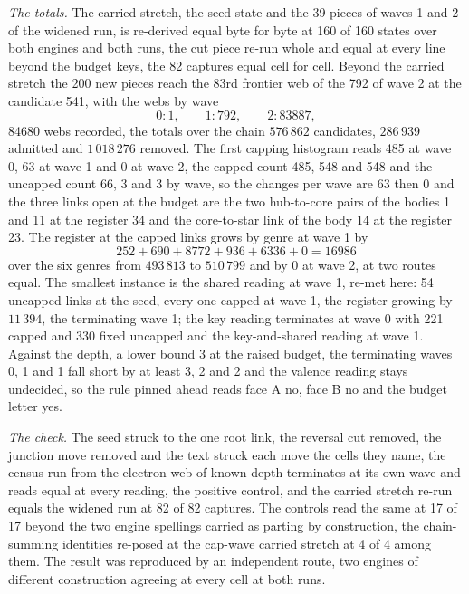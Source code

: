 \begin{chproof}
\textit{The totals.} The carried stretch, the seed state and the 39 pieces of waves 1 and 2 of the widened run, is re-derived equal byte for byte at 160 of 160 states over both engines and both runs, the cut piece re-run whole and equal at every line beyond the budget keys, the 82 captures equal cell for cell. Beyond the carried stretch the 200 new pieces reach the 83rd frontier web of the 792 of wave 2 at the candidate 541, with the webs by wave
\begin{equation}
0:1,\qquad 1:792,\qquad 2:83887,
\end{equation}
84680 webs recorded, the totals over the chain $576\,862$ candidates, $286\,939$ admitted and $1\,018\,276$ removed. The first capping histogram reads 485 at wave 0, 63 at wave 1 and 0 at wave 2, the capped count 485, 548 and 548 and the uncapped count 66, 3 and 3 by wave, so the changes per wave are 63 then 0 and the three links open at the budget are the two hub-to-core pairs of the bodies 1 and 11 at the register 34 and the core-to-star link of the body 14 at the register 23. The register at the capped links grows by genre at wave 1 by
\begin{equation}
252 + 690 + 8772 + 936 + 6336 + 0 = 16986
\end{equation}
over the six genres from $493\,813$ to $510\,799$ and by 0 at wave 2, at two routes equal. The smallest instance is the shared reading at wave 1, re-met here: 54 uncapped links at the seed, every one capped at wave 1, the register growing by $11\,394$, the terminating wave 1; the key reading terminates at wave 0 with 221 capped and 330 fixed uncapped and the key-and-shared reading at wave 1. Against the depth, a lower bound 3 at the raised budget, the terminating waves 0, 1 and 1 fall short by at least 3, 2 and 2 and the valence reading stays undecided, so the rule pinned ahead reads face A no, face B no and the budget letter yes.

\textit{The check.} The seed struck to the one root link, the reversal cut removed, the junction move removed and the text struck each move the cells they name, the census run from the electron web of known depth terminates at its own wave and reads equal at every reading, the positive control, and the carried stretch re-run equals the widened run at 82 of 82 captures. The controls read the same at 17 of 17 beyond the two engine spellings carried as parting by construction, the chain-summing identities re-posed at the cap-wave carried stretch at 4 of 4 among them. The result was reproduced by an independent route, two engines of different construction agreeing at every cell at both runs.
\end{chproof}
